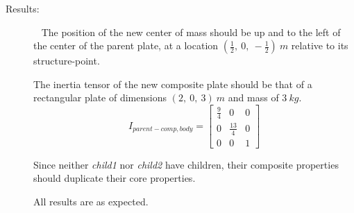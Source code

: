 \begin{description}
\item[Results:]\ \newline
The position of the new center of mass should be up and to the left of the 
center of the parent plate, at a location $(\frac{1}{2},~0,~-\frac{1}{2})~m$ 
relative to its structure-point.

The inertia tensor of the new composite plate should be that of a rectangular 
plate of dimensions $(2,~0,~3)~m$ and mass of $3~kg$.  
\begin{equation*}
I_{parent-comp,body} = 
   \begin{bmatrix} \frac{9}{4} & 0   & 0  \\
                   0   & \frac{13}{4} & 0   \\
                    0  & 0   & 1  
   \end{bmatrix}
\end{equation*}

Since neither \textit{child1} nor \textit{child2} have children, their 
composite properties should duplicate their core properties.

All results are as expected.
\end{description}






